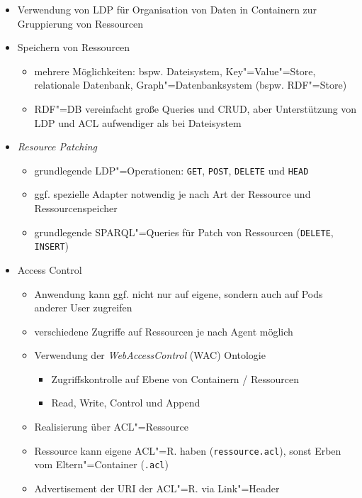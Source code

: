 \begin{itemize}
    \item Verwendung von LDP für Organisation von Daten in Containern zur Gruppierung von Ressourcen~\cite{sambraSolidPlatformDecentralized2016}
    
    \item Speichern von Ressourcen
    \begin{itemize}
        \item mehrere Möglichkeiten: bspw. Dateisystem, Key"=Value"=Store, relationale Datenbank, Graph"=Datenbanksystem (bspw. RDF"=Store)~\cite{sambraSolidPlatformDecentralized2016}
        \item RDF"=DB vereinfacht große Queries und CRUD, aber Unterstützung von LDP und ACL aufwendiger als bei Dateisystem~\cite{sambraSolidPlatformDecentralized2016}
    \end{itemize}
    
    \item \emph{Resource Patching}
    \begin{itemize}
        \item grundlegende LDP"=Operationen: \texttt{GET}, \texttt{POST}, \texttt{DELETE} und \texttt{HEAD}~\cite{sambraSolidPlatformDecentralized2016}
        \item ggf. spezielle Adapter notwendig je nach Art der Ressource und Ressourcenspeicher
        \item grundlegende SPARQL"=Queries für Patch von Ressourcen (\texttt{DELETE}, \texttt{INSERT})~\cite{sambraSolidPlatformDecentralized2016}
    \end{itemize}

    \item Access Control
    \begin{itemize}
        \item Anwendung kann ggf. nicht nur auf eigene, sondern auch auf Pods anderer User zugreifen~\cite{sambraSolidPlatformDecentralized2016}
        \item verschiedene Zugriffe auf Ressourcen je nach Agent möglich~\cite{sambraSolidPlatformDecentralized2016}
        \item Verwendung der \emph{WebAccessControl} (WAC) Ontologie~\cite{sambraSolidPlatformDecentralized2016}
        \begin{itemize}
            \item Zugriffskontrolle auf Ebene von Containern / Ressourcen~\cite{sambraSolidPlatformDecentralized2016}
            \item Read, Write, Control und Append~\cite{sambraSolidPlatformDecentralized2016}
        \end{itemize}
        \item Realisierung über ACL"=Ressource~\cite{sambraSolidPlatformDecentralized2016}
        \item Ressource kann eigene ACL"=R. haben (\texttt{ressource.acl}), sonst Erben vom Eltern"=Container (\texttt{.acl})~\cite{sambraSolidPlatformDecentralized2016}
        \item Advertisement der URI der ACL"=R. via Link"=Header
    \end{itemize}


\end{itemize}
